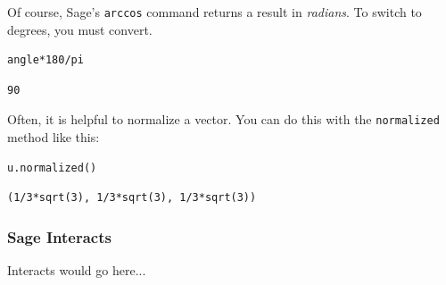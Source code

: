 \documentclass[10pt,]{book}
\theoremstyle{plain}
\theoremstyle{definition}
\numberwithin{equation}{section}
\begin{document}
      Of course, Sage's \verb?arccos? command returns a result in \emph{radians}.
      To switch to degrees, you must convert.
\begin{lstlisting}[style=sageinput]
angle*180/pi
\end{lstlisting}
\begin{lstlisting}[style=sageoutput]
90
\end{lstlisting}
\par
Often, it is helpful to normalize a vector. You can do this with the
      \verb?normalized? method like this:
\begin{lstlisting}[style=sageinput]
u.normalized()
\end{lstlisting}
\begin{lstlisting}[style=sageoutput]
(1/3*sqrt(3), 1/3*sqrt(3), 1/3*sqrt(3))
\end{lstlisting}
\typeout{************************************************}
\typeout{************************************************}
\subsubsection[Sage Interacts]{Sage Interacts}\label{subsubsection-3}
Interacts would go here...%
\typeout{************************************************}
\typeout{************************************************}
\end{document}
